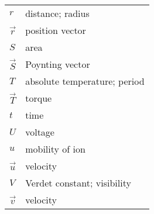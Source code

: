 \begin{table}[h]
\begin{center}
{\begin{tabular}{p{0.5cm} p{11cm}}
				$r$ & distance; radius\\
				$\vec{r}$ & position vector\\
				$S$ & area\\
				$\vec{S}$ & Poynting vector\\
				$T$ & absolute temperature; period\\
				$\vec{T}$ & torque\\
				$t$ & time\\
				$U$ & voltage\\
				$u$ & mobility of ion\\
				$\vec{u}$ & velocity\\
				$V$ & Verdet constant; visibility\\
				$\vec{v}$ & velocity\\
			\end{tabular}
	}\end{center}
\end{table}

